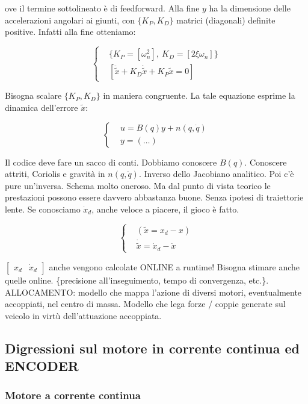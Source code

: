 ove il termine sottolineato è di feedforward. Alla fine $y$ ha la dimensione delle accelerazioni angolari ai giunti, con $\{K_P,K_D\}$ matrici (diagonali) definite positive. Infatti alla fine otteniamo:

\[
	\left\{
	\begin{aligned}
	&\{K_P=[\omega_n^2],\ K_D=[2\xi\omega_n]\}\\
	&[\ddot{\tilde{x}} + K_D\dot{\tilde{x}} + K_P\tilde{x} = 0]
	\end{aligned}
	\right.
\]

Bisogna scalare $\{K_P,K_D\}$ in maniera congruente. La tale equazione esprime la dinamica dell'errore $\tilde{x}$:

\[
	\left\{
	\begin{aligned}
	&u = B(q)y+n(q,\dot{q})\\
	&y=(\dots)
	\end{aligned}
	\right.
\]

Il codice deve fare un sacco di conti. Dobbiamo conoscere $B(q)$. Conoscere attriti, Coriolis e gravità in $n(q,\dot{q})$. Inverso dello Jacobiano analitico. Poi c'è pure un'inversa. Schema molto oneroso. Ma dal punto di vista teorico le prestazioni possono essere davvero abbastanza buone. Senza ipotesi di traiettorie lente. Se conosciamo $\dot{x}_d$, anche veloce a piacere, il gioco è fatto.

\[
	\left\{
	\begin{aligned}
	&(\tilde{x}=x_d-x)\\
	&\dot{\tilde{x}} = \dot{x}_d-\dot{x}
	\end{aligned}
	\right.
\]

$\begin{bmatrix}x_d&\dot{x}_d\end{bmatrix}$ anche vengono calcolate ONLINE a runtime! Bisogna stimare anche quelle online. \{precisione all'inseguimento, tempo di convergenza, etc.\}. ALLOCAMENTO: modello che mappa l'azione di diversi motori, eventualmente accoppiati, nel centro di massa. Modello che lega forze / coppie generate sul veicolo in virtù dell'attuazione accoppiata.

\subsection{Digressioni sul motore in corrente continua ed ENCODER}

\subsubsection{Motore a corrente continua}

